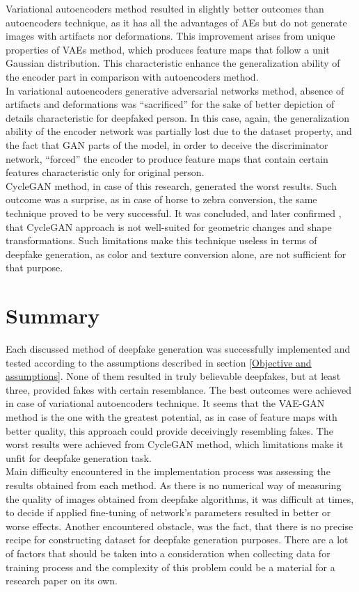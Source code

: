 Variational autoencoders method resulted in slightly better outcomes than autoencoders technique, as it has all the advantages of AEs but do not generate images with artifacts nor deformations. This improvement arises from unique
properties of VAEs method, which produces feature maps that follow a unit Gaussian distribution. This characteristic enhance the generalization ability of the encoder part in comparison with autoencoders method.\\

In variational autoencoders generative adversarial networks method, absence of artifacts and deformations was ``sacrificed'' for the sake of better depiction of details characteristic for deepfaked person. In this case, again, the generalization ability of the encoder network was partially lost due to the dataset property, and the fact that GAN parts of the model, in order to deceive the discriminator network, ``forced'' the encoder to produce feature maps that contain certain features characteristic only for original person.\\

CycleGAN method, in case of this research, generated the worst results. Such outcome was a surprise, as in case of horse to zebra conversion, the same technique proved to be very successful. It was concluded, and later confirmed \cite{cycleGAN_6_bib}, that CycleGAN approach is not well-suited for geometric changes and shape transformations. Such limitations make this technique useless in terms of deepfake generation, as color and texture conversion alone, are not sufficient for that purpose.

\section{Summary}
Each discussed method of deepfake generation was successfully implemented and tested according to the assumptions described in section \ref{Objective and assumptions}. None of them resulted in truly believable deepfakes, but at least three, provided fakes with certain resemblance. The best outcomes were achieved in case of variational autoencoders technique. It seems that the VAE-GAN method is the one with the greatest potential, as in case of feature maps with better quality, this approach could provide deceivingly resembling fakes. The worst results were achieved from CycleGAN method, which limitations make it unfit for deepfake generation task.\\

Main difficulty encountered in the implementation process was assessing the results obtained from each method. As there is no numerical way of measuring the quality of images obtained from deepfake algorithms, it was difficult at times, to decide if applied fine-tuning of network's parameters resulted in better or worse effects. Another encountered obstacle, was the fact, that there is no precise recipe for constructing dataset for deepfake generation purposes. There are a lot of factors that should be taken into a consideration when collecting data for training process and the complexity of this problem could be a material for a research paper on its own.\\

